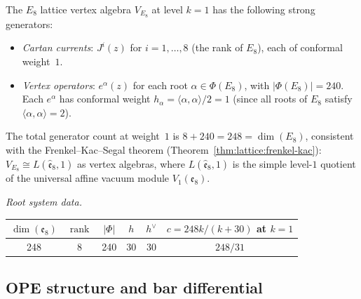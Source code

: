 \begin{computation}
\label{comp:E8-generators}
The $E_8$ lattice vertex algebra $V_{E_8}$ at level $k = 1$ has the
following strong generators:
\begin{itemize}
\item \emph{Cartan currents}: $J^i(z)$ for $i = 1, \ldots, 8$
 (the rank of $E_8$), each of conformal weight~$1$.
\item \emph{Vertex operators}: $e^\alpha(z)$ for each root
 $\alpha \in \Phi(E_8)$, with $|\Phi(E_8)| = 240$.
 Each $e^\alpha$ has conformal weight
 $h_\alpha = \langle \alpha, \alpha \rangle / 2 = 1$
 (since all roots of $E_8$ satisfy $\langle \alpha, \alpha \rangle = 2$).
\end{itemize}
The total generator count at weight~$1$ is
$8 + 240 = 248 = \dim(E_8)$, consistent with the Frenkel--Kac--Segal
theorem (Theorem~\ref{thm:lattice:frenkel-kac}):
$V_{E_8} \cong L(\widehat{\mathfrak e}_8,1)$ as vertex algebras,
where $L(\widehat{\mathfrak e}_8,1)$ is the simple level-$1$
quotient of the universal affine vacuum module
$V_1(\mathfrak e_8)$.

\emph{Root system data.}
\begin{center}
\renewcommand{\arraystretch}{1.15}
\begin{tabular}{cccccc}
$\dim(\mathfrak{e}_8)$ & $\operatorname{rank}$ & $|\Phi|$ & $h$
 & $h^\vee$ & $c = 248k/(k+30)$ at $k=1$ \\
\hline
248 & 8 & 240 & 30 & 30 & $248/31$
\end{tabular}
\end{center}
\end{computation}

\subsection{OPE structure and bar differential}

